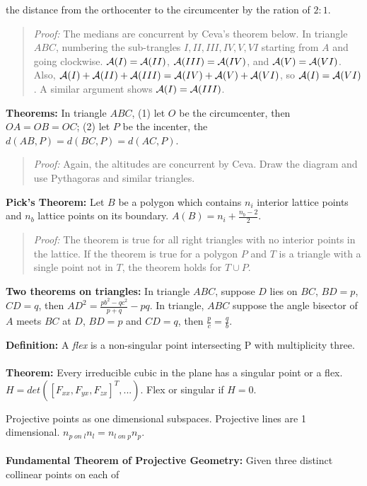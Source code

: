 the distance from the orthocenter to the circumcenter by the ration of $2:1$.
\begin{quote}
\emph{Proof:}
The medians are concurrent by Ceva's theorem below.  In triangle $ABC$, numbering the sub-trangles
$I, II, III, IV, V, VI$ starting from $A$ and going clockwise. ${\cal A}(I) = {\cal A}(II)$,
${\cal A}(III) = {\cal A}(IV)$, and ${\cal A}(V) = {\cal A}(VI)$.  Also,
${\cal A}(I) + {\cal A}(II) + {\cal A}(III)= {\cal A}(IV) +  {\cal A}(V) + {\cal A}(VI)$, so
${\cal A}(I) = {\cal A}(VI)$.  A similar argument shows ${\cal A}(I) = {\cal A}(III)$.
\end{quote}
{\bf Theorems:}  In triangle $ABC$, (1) let $O$ be the circumcenter, then $OA = OB = OC$;
(2) let $P$ be the incenter, the $d(AB, P) = d(BC, P) = d(AC, P)$.
\begin{quote}
\emph{Proof:}
Again, the altitudes are concurrent by Ceva.  Draw the diagram and use Pythagoras and similar triangles.
\end{quote}
{\bf Pick's Theorem:}  Let $B$ be a polygon which contains
$n_i$ interior lattice points and
$n_b$ lattice points on its boundary. $A(B)= n_i+{\frac {n_b-2} 2}$.
\begin{quote}
\emph{Proof:}
The theorem is true for all right triangles with no interior points in the lattice. 
If the theorem is true for a polygon $P$ and $T$ is a triangle with a single point not in $T$,
the theorem holds for $T \cup P$.
\end{quote}
{\bf Two theorems on triangles:} In triangle $ABC$, suppose $D$ lies on $BC$, $BD=p$,
$CD=q$, then $AD^2= {\frac {pb^2-qc^2} {p+q}} - pq$.  In triangle, $ABC$ suppose the
angle bisector of $A$ meets $BC$ at $D$, $BD=p$ and $CD=q$, then ${\frac {p}{c}}= {\frac {q}{b}}$.
\begin{quote}
\end{quote}
{\bf Definition:}
A \emph{flex} is a non-singular point intersecting P with multiplicity three.  
\\
\\
{\bf Theorem:}  Every irreducible cubic
in the plane has a singular point or a flex.  $H= det([F_{xx}, F_{yx}, F_{zx}]^T, ...)$.
Flex or singular if $H=0$.
\begin{quote}
\end{quote}
Projective points as one dimensional subspaces.  Projective lines are 1 dimensional.
$n_{p \; on \; l} n_l= n_{l \; on \; p} n_p$.
\\
\\
{\bf Fundamental Theorem of Projective Geometry:}  Given three distinct collinear points on each of 
